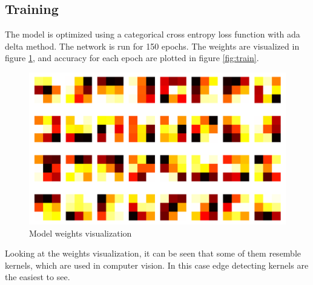 \documentclass[paper=a4, fontsize=11pt]{scrartcl} %
\begin{document}
    \subsection*{Training}
    The model is optimized using a categorical cross entropy loss function with ada delta method. The network is run for 150 epochs. The weights are visualized in figure \ref{fig:weights}, and accuracy for each epoch are plotted in figure \ref{fig:train}.
    \begin{figure}[H]
        \begin{center}
            \includegraphics[width=1.0\linewidth]{images/mnist_weights.png}
            \caption{Model weights visualization}
            \label{fig:weights}
        \end{center}
    \end{figure}
    Looking at the weights visualization, it can be seen that some of them resemble kernels, which are used in computer vision. In this case edge detecting kernels are the easiest to see.
\end{document}
